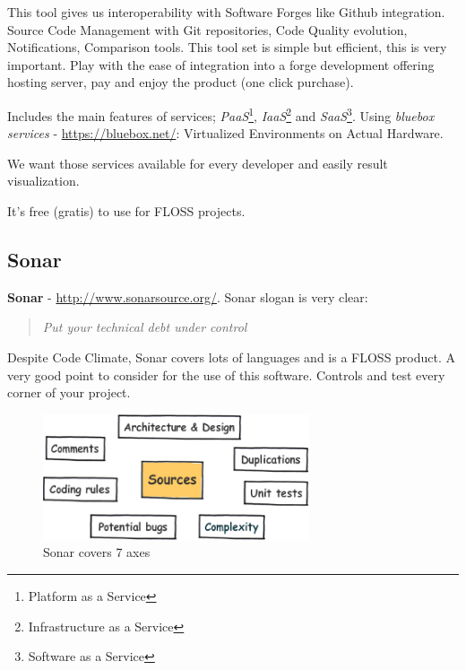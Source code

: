 \documentclass[11pt]{scrartcl}
\begin{document}
\par This tool gives us interoperability with Software Forges like Github integration. Source Code Management with Git repositories, Code Quality evolution, Notifications, Comparison tools. This tool set is simple but efficient, this is very important. Play with the ease of integration into a forge development offering hosting server, pay and enjoy the product (one click purchase).

\par Includes the main features of services; \emph{PaaS}\footnote{Platform as a Service}, \emph{IaaS}\footnote{Infrastructure as a Service} and \emph{SaaS}\footnote{Software as a Service}. Using \emph{bluebox services} - \url{https://bluebox.net/}: Virtualized Environments on Actual Hardware.

\par We want those services available for every developer and easily result visualization.

\par It's free (gratis) to use for FLOSS projects.


\subsection{Sonar}
\label{sub:sonar}

\textbf{Sonar} - \url{http://www.sonarsource.org/}. Sonar slogan is very clear:

\begin{quote}
    \emph{Put your technical debt under control}
\end{quote}

\par Despite Code Climate, Sonar covers lots of languages and is a FLOSS product. A very good point to consider for the use of this software. Controls and test every corner of your project.

\begin{figure}[H]
\centering
\includegraphics[width=0.7\textwidth]{sonar7axes.png}
\caption{Sonar covers 7 axes}
\label{sonar7axes}
\end{figure}
\end{document}

